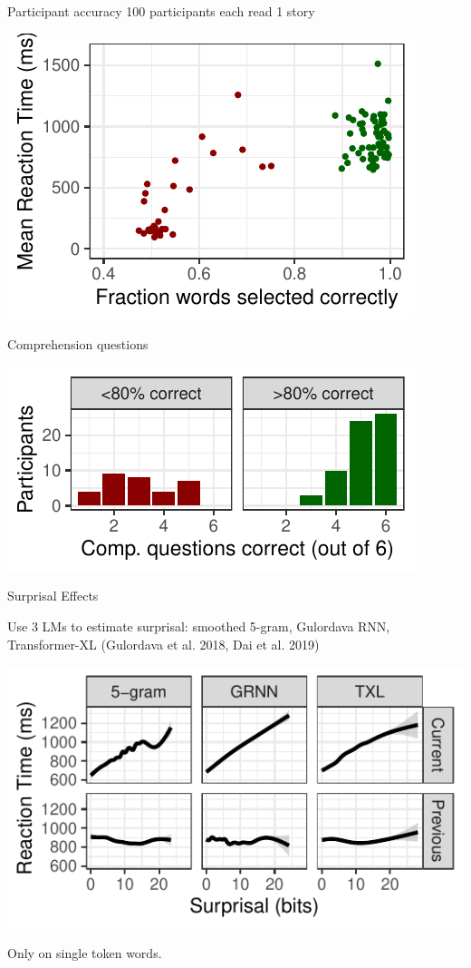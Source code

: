 \documentclass[12pt, xcolor=beamer,table,usenames,dvipsnames, ignorenonframetext, ngerman]{beamer}
\begin{document}
\begin{frame}{Participant accuracy}
100 participants each read 1 story \pause
\begin{center}
\includegraphics[width=.8\textwidth]{error.pdf}
\end{center}
\end{frame}
\begin{frame}{Comprehension questions}
\begin{center} \pause
\includegraphics[width=.8\textwidth]{comp.pdf}
\end{center}
\end{frame}



\begin{frame}{Surprisal Effects}

Use 3 LMs to estimate surprisal: smoothed 5-gram, Gulordava RNN, Transformer-XL (Gulordava et al. 2018, Dai et al. 2019)

\includegraphics[width=.9\textwidth]{gam.pdf}	

Only on single token words.

\end{frame}
\end{document}
